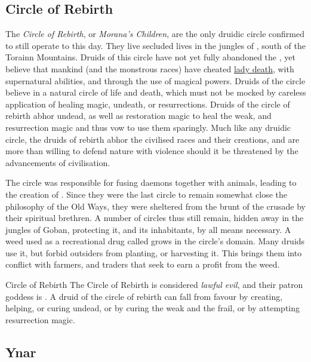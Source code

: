 \subsection{Circle of Rebirth}
\label{sec:Circle of Rebirth}

The \emph{Circle of Rebirth}, or \emph{Morana's Children}, are the only
druidic circle confirmed to still operate to this day. They live secluded
lives in the jungles of , south of the Torainn
Mountains. Druids of this circle have not yet fully abandoned the
, yet believe that mankind (and the monstrous races)
have cheated \hyperref[sec:Morana]{lady death}, with supernatural abilities,
and through the use of magical powers. Druids of the circle believe in a
natural circle of life and death, which must not be mocked by careless
application of healing magic, undeath, or resurrections. Druids of the circle
of rebirth abhor undead, as well as restoration magic to heal the weak, and
resurrection magic and thus vow to use them sparingly. Much like any druidic
circle, the druids of rebirth abhor the civilised races and their creations,
and are more than willing to defend nature with violence should it be
threatened by the advancements of civilisation.

The circle was responsible for fusing daemons together with animals, leading
to the creation of . Since they were the last
circle to remain somewhat close the philosophy of the Old Ways, they were
sheltered from the brunt of the crusade by their spiritual brethren. A number
of circles thus still remain, hidden away in the jungles of Goban, protecting
it, and its inhabitants, by all means necessary. A weed used as a recreational
drug called  grows in the circle's domain. Many druids
use it, but forbid outsiders from planting, or harvesting it. This brings them
into conflict with farmers, and traders that seek to earn a profit from the
weed.

\begin{35e}{Circle of Rebirth}
  The Circle of Rebirth is considered \emph{lawful evil}, and their patron
  goddess is . A druid of the circle of rebirth can fall
  from favour by creating, helping, or curing undead, or by curing the weak
  and the frail, or by attempting resurrection magic.
\end{35e}

\subsection{Ynar}
\label{sec:Ynar}

